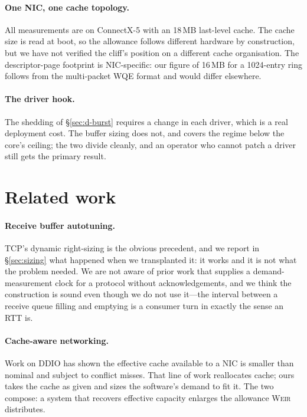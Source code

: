\documentclass[letterpaper,twocolumn,10pt]{article}
\newcommand{\sys}{\textsc{Weir}\xspace}
\begin{document}
\paragraph{One NIC, one cache topology.} All measurements are on ConnectX-5 with
an 18\,MB last-level cache. The cache size is read at boot, so the allowance
follows different hardware by construction, but we have not verified the cliff's
position on a different cache organisation. The descriptor-page footprint is
NIC-specific: our figure of 16\,MB for a 1024-entry ring follows from the
multi-packet WQE format and would differ elsewhere.

\paragraph{The driver hook.} The shedding of \S\ref{sec:d-burst} requires a change
in each driver, which is a real deployment cost. The buffer sizing does not, and
covers the regime below the core's ceiling; the two divide cleanly, and an
operator who cannot patch a driver still gets the primary result.

\section{Related work}

\paragraph{Receive buffer autotuning.} TCP's dynamic right-sizing is the obvious
precedent, and we report in \S\ref{sec:sizing} what happened when we transplanted
it: it works and it is not what the problem needed. We are not aware of prior
work that supplies a demand-measurement clock for a protocol without
acknowledgements, and we think the construction is sound even though we do not
use it---the interval between a receive queue filling and emptying is a
consumer turn in exactly the sense an RTT is.

\paragraph{Cache-aware networking.} Work on DDIO has shown the effective cache
available to a NIC is smaller than nominal and subject to conflict misses.
That line of work reallocates cache; ours takes the cache as given and sizes the
software's demand to fit it. The two compose: a system that recovers effective
capacity enlarges the allowance \sys distributes.
\end{document}
